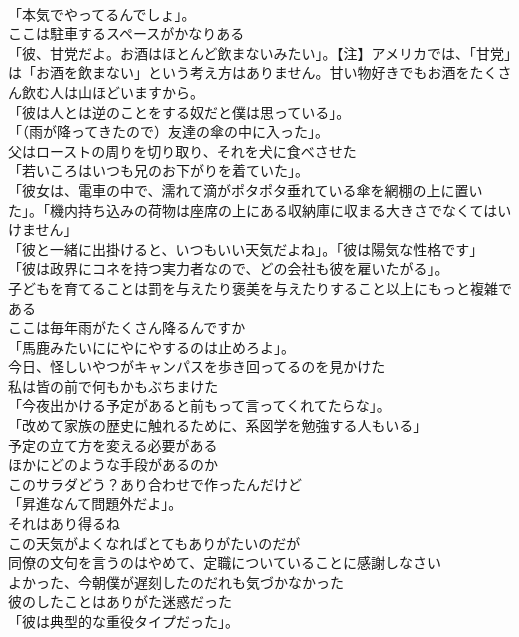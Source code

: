 \documentclass[8pt]{extreport}
\begin{document}
\begin{CJK}{UTF8}{min}
\\	「本気でやってるんでしょ」。	
\\	ここは駐車するスペースがかなりある	
\\	「彼、甘党だよ。お酒はほとんど飲まないみたい」。【注】アメリカでは、「甘党」は「お酒を飲まない」という考え方はありません。甘い物好きでもお酒をたくさん飲む人は山ほどいますから。	
\\	「彼は人とは逆のことをする奴だと僕は思っている」。	
\\	「（雨が降ってきたので）友達の傘の中に入った」。	
\\	父はローストの周りを切り取り、それを犬に食べさせた	
\\	「若いころはいつも兄のお下がりを着ていた」。	
\\	「彼女は、電車の中で、濡れて滴がポタポタ垂れている傘を網棚の上に置いた」。「機内持ち込みの荷物は座席の上にある収納庫に収まる大きさでなくてはいけません」	
\\	「彼と一緒に出掛けると、いつもいい天気だよね」。「彼は陽気な性格です」	
\\	「彼は政界にコネを持つ実力者なので、どの会社も彼を雇いたがる」。	
\\	子どもを育てることは罰を与えたり褒美を与えたりすること以上にもっと複雑である	
\\	ここは毎年雨がたくさん降るんですか	
\\	「馬鹿みたいににやにやするのは止めろよ」。	
\\	今日、怪しいやつがキャンパスを歩き回ってるのを見かけた	
\\	私は皆の前で何もかもぶちまけた	
\\	「今夜出かける予定があると前もって言ってくれてたらな」。	
\\	「改めて家族の歴史に触れるために、系図学を勉強する人もいる」	
\\	予定の立て方を変える必要がある	
\\	ほかにどのような手段があるのか	
\\	このサラダどう？あり合わせで作ったんだけど	
\\	「昇進なんて問題外だよ」。	
\\	それはあり得るね	
\\	この天気がよくなればとてもありがたいのだが	
\\	同僚の文句を言うのはやめて、定職についていることに感謝しなさい	
\\	よかった、今朝僕が遅刻したのだれも気づかなかった	
\\	彼のしたことはありがた迷惑だった	
\\	「彼は典型的な重役タイプだった」。	

\end{CJK}
\end{document}
